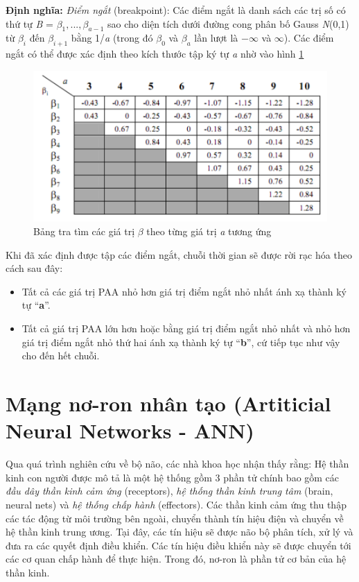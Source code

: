 \textbf{Định nghĩa:} \textit{Điểm ngắt} (breakpoint): Các điểm ngắt là danh sách các trị số có thứ tự \textit{B} = $\beta_{1},..., \beta_{a-1}$ sao cho diện tích dưới đường cong phân bố Gauss \textit{N}(0,1) từ $\beta_{i}$ đến $\beta_{i+1}$ bằng 1/\textit{a} (trong đó $\beta_{0}$ và $\beta_{a}$ lần lượt là $-\infty$ và $\infty$). Các điểm ngắt có thể được xác định theo kích thước tập ký tự \textit{a} nhờ vào hình \ref{fig:2-4p}

\begin{figure}[H]
    \centering
    \includegraphics[scale=0.45]{./content/images/2-4p.png}
    \caption{Bảng tra tìm các giá trị $\beta$ theo từng giá trị \textit{a} tương ứng}
    \label{fig:2-4p}
\end{figure}

Khi đã xác định được tập các điểm ngắt, chuỗi thời gian sẽ được rời rạc hóa theo cách sau đây:
\begin{itemize}
\item Tất cả các giá trị PAA nhỏ hơn giá trị điểm ngắt nhỏ nhất ánh xạ thành ký tự “\textbf{a}”.
\item Tất cả giá trị PAA lớn hơn hoặc bằng giá trị điểm ngắt nhỏ nhất và nhỏ hơn giá trị điểm ngắt nhỏ thứ hai ánh xạ thành ký tự “\textbf{b}”, cứ tiếp tục như vậy cho đến hết chuỗi.
\end{itemize}

\section{Mạng nơ-ron nhân tạo (Artiticial Neural Networks - ANN)}
Qua quá trình nghiên cứu về bộ não, các nhà khoa học nhận thấy rằng: Hệ thần kinh con người được mô tả là một hệ thống gồm 3 phần tử chính bao gồm các \textit{đầu dây thần kinh cảm ứng} (receptors), \textit{hệ thống thần kinh trung tâm} (brain, neural nets) và \textit{hệ thống chấp hành} (effectors). Các thần kinh cảm ứng thu thập các tác động từ môi trường bên ngoài, chuyển thành tín hiệu điện và chuyển về hệ thần kinh trung ương. Tại đây, các tín hiệu sẽ được não bộ phân tích, xử lý và đưa ra các quyết định điều khiển. Các tín hiệu điều khiển này sẽ được chuyển tới các cơ quan chấp hành để thực hiện. Trong đó, nơ-ron là phần tử cơ bản của hệ thần kinh.

